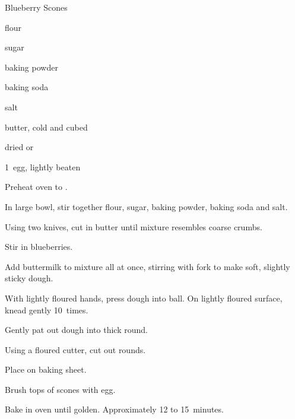 \begin{recipe}{Blueberry Scones}{}{}

\begin{ingredients}
\item \C{2\quarter} flour
\item {} sugar
\item \tp{2\half} baking powder
\item \tp{\half} baking soda
\item \tp{\half} salt
\item \C{\half} butter, cold and cubed
\item \C{\half} dried  or 
\item {} 
\item 1~egg, lightly beaten
\end{ingredients}

\begin{directions}
\item Preheat oven to .
\item In large bowl, stir together flour, sugar, baking powder, baking soda and salt.
\item Using two knives, cut in butter until mixture resembles coarse crumbs.
\item Stir in blueberries.
\item Add buttermilk to mixture all at once, stirring with fork to make soft, slightly sticky dough.
\item With lightly floured hands, press dough into ball. On lightly floured surface, knead gently 10~times.
\item Gently pat out dough into  thick round.
\item Using a  floured cutter, cut out rounds.
\item Place on baking sheet.
\item Brush tops of scones with egg.
\item Bake in oven until golden. Approximately 12 to 15~minutes.
\end{directions}

\end{recipe}
